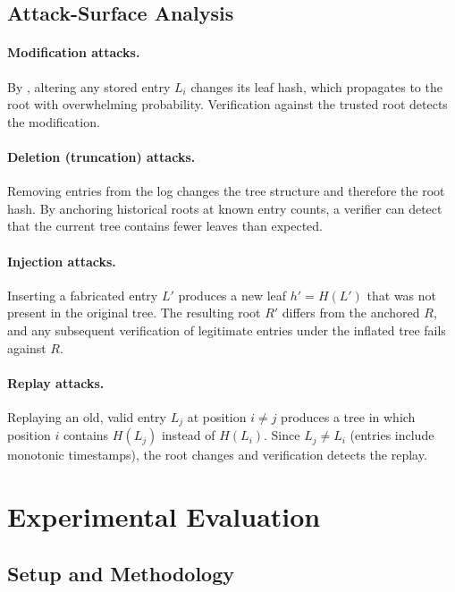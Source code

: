 \documentclass[preprint,12pt]{elsarticle}
\begin{document}
\subsection{Attack-Surface Analysis}

\paragraph{Modification attacks.}
By , altering any stored entry $L_i$ changes its leaf hash, which propagates to the root with overwhelming probability.
Verification against the trusted root detects the modification.

\paragraph{Deletion (truncation) attacks.}
Removing entries from the log changes the tree structure and therefore the root hash.
By anchoring historical roots at known entry counts, a verifier can detect that the current tree contains fewer leaves than expected.

\paragraph{Injection attacks.}
Inserting a fabricated entry $L'$ produces a new leaf $h' = H(L')$ that was not present in the original tree.
The resulting root $R'$ differs from the anchored $R$, and any subsequent verification of legitimate entries under the inflated tree fails against $R$.

\paragraph{Replay attacks.}
Replaying an old, valid entry $L_j$ at position $i \neq j$ produces a tree in which position $i$ contains $H(L_j)$ instead of $H(L_i)$.
Since $L_j \neq L_i$ (entries include monotonic timestamps), the root changes and verification detects the replay.


\section{Experimental Evaluation}
\label{sec:evaluation}

\subsection{Setup and Methodology}
\end{document}
